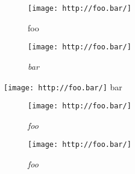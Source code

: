 
\def\mytitle{Figure Images}


\begin{figure}[htbp]
\centering
\texttt{[image: http://foo.bar/]}
\caption{foo}
\label{foo}
\end{figure}

\begin{figure}[htbp]
\centering
\texttt{[image: http://foo.bar/]}
\caption{\emph{bar}}
\label{foo}
\end{figure}

\texttt{[image: http://foo.bar/]} bar

\begin{figure}[htbp]
\centering
\texttt{[image: http://foo.bar/]}
\caption{\emph{foo}}
\end{figure}

\begin{figure}[htbp]
\centering
\texttt{[image: http://foo.bar/]}
\caption{\emph{foo}}
\end{figure}



